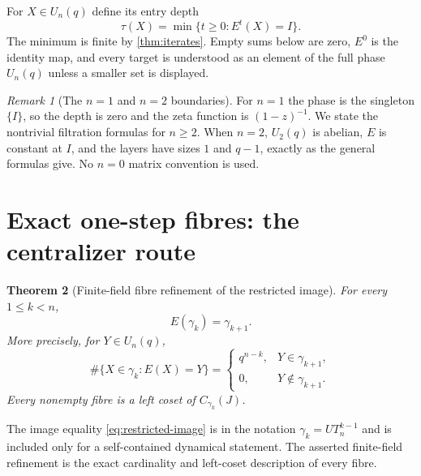 \documentclass[10pt,a4paper]{amsart}
\newtheorem{theorem}{Theorem}[section]
\theoremstyle{definition}
\theoremstyle{remark}
\newtheorem{remark}[theorem]{Remark}
\begin{document}
For $X\in U_n(q)$ define its entry depth
\begin{equation}
 \tau(X)=\min\{t\ge0:E^t(X)=I\}.
 \label{eq:depth}
\end{equation}
The minimum is finite by \cref{thm:iterates}.  Empty sums below are zero,
$E^0$ is the identity map, and every target is understood as an element of
the full phase $U_n(q)$ unless a smaller set is displayed.

\begin{remark}[The $n=1$ and $n=2$ boundaries]
\label{rem:small-n}
For $n=1$ the phase is the singleton $\{I\}$, so the depth is zero and the
zeta function is $(1-z)^{-1}$.  We state the nontrivial filtration formulas
for $n\ge2$.  When $n=2$, $U_2(q)$ is abelian, $E$ is constant at $I$, and
the layers have sizes $1$ and $q-1$, exactly as the general formulas give.
No $n=0$ matrix convention is used.
\end{remark}

\section{Exact one-step fibres: the centralizer route}
\label{sec:coset}

\begin{theorem}[Finite-field fibre refinement of the restricted image]
\label{thm:one-step}
For every $1\le k<n$,
\begin{equation}
                     E(\gamma_k)=\gamma_{k+1}.
 \label{eq:restricted-image}
\end{equation}
More precisely, for $Y\in U_n(q)$,
\begin{equation}
 \#\{X\in\gamma_k:E(X)=Y\}
 =\begin{cases}
   q^{n-k},&Y\in\gamma_{k+1},\\
   0,&Y\notin\gamma_{k+1}.
  \end{cases}
 \label{eq:one-step-fibre}
\end{equation}
Every nonempty fibre is a left coset of $C_{\gamma_k}(J)$.
\end{theorem}

The image equality \eqref{eq:restricted-image} is
\citet[Lemma~1]{Bier2013} in the notation
$\gamma_k=UT_n^{k-1}$ and is included only for a self-contained dynamical
statement.  The asserted finite-field refinement is the exact cardinality
and left-coset description of every fibre.
\end{document}
